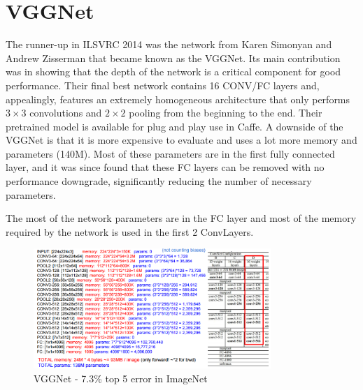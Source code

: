 \section*{VGGNet}
The runner-up in ILSVRC 2014 was the network from Karen Simonyan and Andrew Zisserman that became known as the VGGNet. Its main contribution was in showing that the depth of the network is a critical component for good performance. Their final best network contains 16 CONV/FC layers and, appealingly, features an extremely homogeneous architecture that only performs $3 \times 3$ convolutions and $2 \times 2$ pooling from the beginning to the end. Their pretrained model is available for plug and play use in Caffe. A downside of the VGGNet is that it is more expensive to evaluate and uses a lot more memory and parameters (140M). Most of these parameters are in the first fully connected layer, and it was since found that these FC layers can be removed with no performance downgrade, significantly reducing the number of necessary parameters.

The most of the network parameters are in the FC layer and most of the memory required by the network is used in the first 2 ConvLayers.

\begin{figure}[h]
  \centering
  \includegraphics[width=0.8\textwidth]{Images/famous_networks/3.png}
  \caption{VGGNet - 7.3\% top 5 error in ImageNet}
\end{figure}

